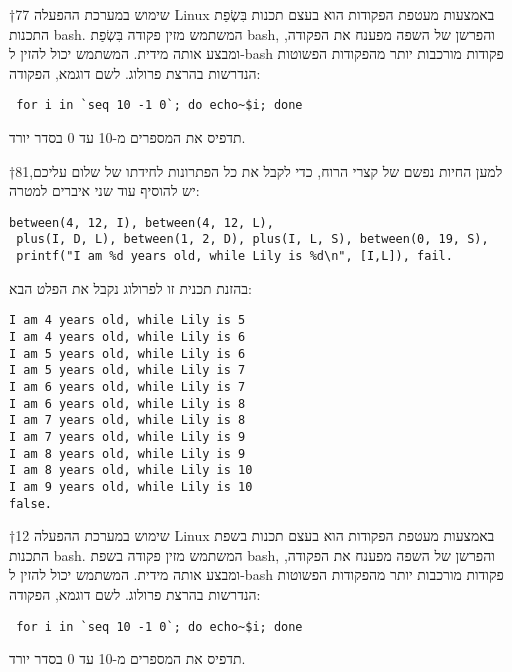 †{77} שימוש במערכת ההפעלה Linux באמצעות מעטפת הפקודות הוא בעצם תכנות בִּשְׂפַת התכנות bash. המשתמש מזין פקודה בִּשְׂפַת bash, והפרשן של השפה מפענח את הפקודה, ומבצע אותה מידית. המשתמש יכול להזין ל-bash פקודות מורכבות יותר מהפקודות הפשוטות הנדרשות בהרצת פרולוג. לשם דוגמא, הפקודה:
\begin{verbatim}
 for i in `seq 10 -1 0`; do echo~$i; done
\end{verbatim}
        תדפיס את המספרים מ-10 עד 0 בסדר יורד.

†{81}למען החיות נפשם של קצרי הרוח, כדי לקבל את כל הפתרונות לחידתו של שלום עליכם, יש להוסיף עוד שני איברים למטרה:
\begin{verbatim}
between(4, 12, I), between(4, 12, L),
 plus(I, D, L), between(1, 2, D), plus(I, L, S), between(0, 19, S),
 printf("I am %d years old, while Lily is %d\n", [I,L]), fail.
\end{verbatim}
        בהזנת תכנית זו לפרולוג נקבל את הפלט הבא:
\begin{verbatim}
I am 4 years old, while Lily is 5
I am 4 years old, while Lily is 6
I am 5 years old, while Lily is 6
I am 5 years old, while Lily is 7
I am 6 years old, while Lily is 7
I am 6 years old, while Lily is 8
I am 7 years old, while Lily is 8
I am 7 years old, while Lily is 9
I am 8 years old, while Lily is 9
I am 8 years old, while Lily is 10
I am 9 years old, while Lily is 10
false.
\end{verbatim}

†{12} שימוש במערכת ההפעלה Linux באמצעות מעטפת הפקודות הוא בעצם תכנות בשפת התכנות bash. המשתמש מזין פקודה בשפת bash, והפרשן של השפה מפענח את הפקודה, ומבצע אותה מידית. המשתמש יכול להזין ל-bash פקודות מורכבות יותר מהפקודות הפשוטות הנדרשות בהרצת פרולוג. לשם דוגמא, הפקודה:
\begin{verbatim}
 for i in `seq 10 -1 0`; do echo~$i; done
\end{verbatim}
        תדפיס את המספרים מ-10 עד 0 בסדר יורד.
